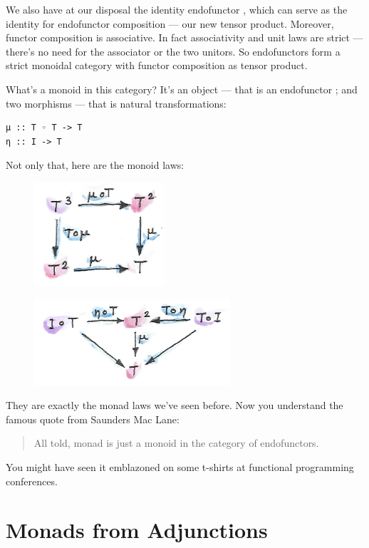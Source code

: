 \noindent
We also have at our disposal the identity endofunctor , which
can serve as the identity for endofunctor composition --- our new tensor
product. Moreover, functor composition is associative. In fact
associativity and unit laws are strict --- there's no need for the
associator or the two unitors. So endofunctors form a strict monoidal
category with functor composition as tensor product.

What's a monoid in this category? It's an object --- that is an
endofunctor ; and two morphisms --- that is natural
transformations:

\begin{Verbatim}[commandchars=\\\{\}]
μ :: T ◦ T -> T
η :: I -> T
\end{Verbatim}
Not only that, here are the monoid laws:

\begin{figure}[H]
\centering
\includegraphics[width=1.90625in]{images/assoc.png}
\end{figure}

\begin{figure}[H]
\centering
\includegraphics[width=2.86458in]{images/unitlawcomp.png}
\end{figure}

\noindent
They are exactly the monad laws we've seen before. Now you understand
the famous quote from Saunders Mac Lane:

\begin{quote}
All told, monad is just a monoid in the category of endofunctors.
\end{quote}
You might have seen it emblazoned on some t-shirts at functional
programming conferences.

\section{Monads from Adjunctions}\label{monads-from-adjunctions}

